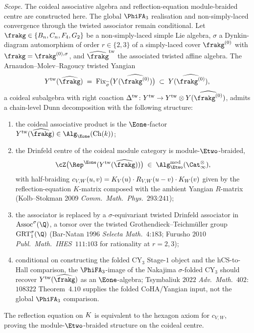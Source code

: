 \begin{theorem}
\label{thm:dunn-frontier-non-simply-laced}
\noindent\emph{Scope.} The coideal associative algebra and
reflection-equation module-braided centre are constructed here. The
global $\PhiFA_3$ realisation and non-simply-laced convergence through
the twisted associator remain conditional.
Let $\frakg \in \{B_n, C_n, F_4, G_2\}$ be a non-simply-laced simple Lie algebra, $\sigma$ a Dynkin-diagram automorphism of order $r \in \{2, 3\}$ of a simply-laced cover $\frakg^{(0)}$ with $\frakg = \frakg^{(0), \sigma}$, and $\widehat\frakg^{\mathrm{tw}}$ the associated twisted affine algebra. The Arnaudon--Molev--Ragoucy twisted Yangian
\[
 Y^{\mathrm{tw}}(\widehat\frakg) \;=\; \mathrm{Fix}_{\widetilde\sigma}\bigl(Y(\widehat{\frakg^{(0)}})\bigr) \;\subset\; Y(\widehat{\frakg^{(0)}}),
\]
a coideal subalgebra with right coaction $\Delta^{\mathrm{tw}} \colon Y^{\mathrm{tw}} \to Y^{\mathrm{tw}} \otimes Y(\widehat{\frakg^{(0)}})$, admits a chain-level Dunn decomposition with the following structure:
\begin{enumerate}[label=(\roman*)]
\item the coideal associative product is the $\Eone$-factor $Y^{\mathrm{tw}}(\widehat\frakg) \in \Alg_{\Eone}(\mathrm{Ch}(k))$;
\item the Drinfeld centre of the coideal module category is module-$\Etwo$-braided,
\[
 \cZ\bigl(\Rep^{\Eone}(Y^{\mathrm{tw}}(\widehat\frakg))\bigr) \;\in\; \Alg^{\mathrm{mod}}_{\Etwo}(\Cat_\infty^{\otimes}),
\]
with half-braiding $c_{V, W}(u, v) = K_V(u) \cdot R_{V, W}(u - v) \cdot K_W(v)$ given by the reflection-equation $K$-matrix composed with the ambient Yangian $R$-matrix (Kolb--Stokman 2009 \emph{Comm.~Math.~Phys.}~$293$:$241$);
\item the associator is replaced by a $\sigma$-equivariant twisted Drinfeld associator in $\Assoc^{\sigma}(\Q)$, a torsor over the twisted Grothendieck--Teichm\"uller group $\GRT_1^{\sigma}(\Q)$ (Bar-Natan $1996$ \emph{Selecta Math.}~$4$:$183$; Furusho $2010$ \emph{Publ.~Math.~IHES}~$111$:$103$ for rationality at $r = 2, 3$);
\item conditional on constructing the folded CY$_3$ Stage-$1$ object and
the hCS-to-Hall comparison, the $\PhiFA_3$-image of the Nakajima
$\sigma$-folded CY$_3$ should recover $Y^{\mathrm{tw}}(\widehat\frakg)$
as an $\Eone$-algebra; Tsymbaliuk $2022$ \emph{Adv.~Math.}~$402$:$108322$
Theorem~$4.10$ supplies the folded CoHA/Yangian input, not the global
$\PhiFA_3$ comparison.
\end{enumerate}
The reflection equation on $K$ is equivalent to the hexagon axiom for $c_{V, W}$, proving the module-$\Etwo$-braided structure on the coideal centre.
\end{theorem}

